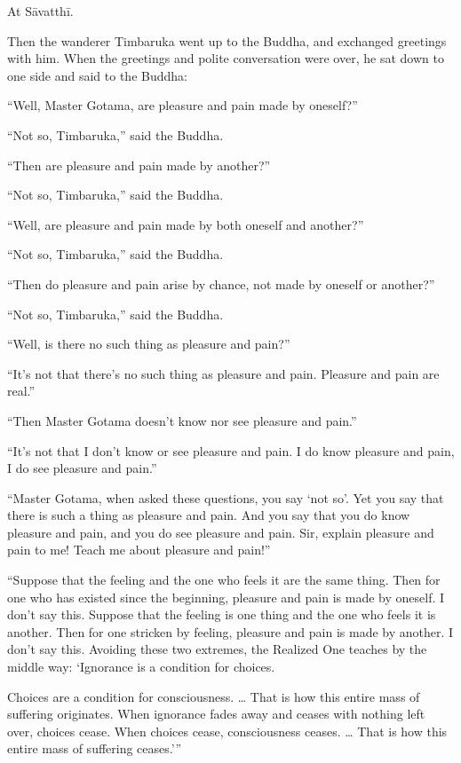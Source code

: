 \documentclass[12pt,openany]{book}%
\begin{document}
At \textsanskrit{Sāvatthī}. 

Then the wanderer Timbaruka went up to the Buddha, and exchanged greetings with him. When the greetings and polite conversation were over, he sat down to one side and said to the Buddha: 

“Well, Master Gotama, are pleasure and pain made by oneself?” 

“Not so, Timbaruka,” said the Buddha. 

“Then are pleasure and pain made by another?” 

“Not so, Timbaruka,” said the Buddha. 

“Well, are pleasure and pain made by both oneself and another?” 

“Not so, Timbaruka,” said the Buddha. 

“Then do pleasure and pain arise by chance, not made by oneself or another?” 

“Not so, Timbaruka,” said the Buddha. 

“Well, is there no such thing as pleasure and pain?” 

“It’s not that there’s no such thing as pleasure and pain. Pleasure and pain are real.” 

“Then Master Gotama doesn’t know nor see pleasure and pain.” 

“It’s not that I don’t know or see pleasure and pain. I do know pleasure and pain, I do see pleasure and pain.” 

“Master Gotama, when asked these questions, you say ‘not so’. Yet you say that there is such a thing as pleasure and pain. And you say that you do know pleasure and pain, and you do see pleasure and pain. Sir, explain pleasure and pain to me! Teach me about pleasure and pain!” 

“Suppose that the feeling and the one who feels it are the same thing. Then for one who has existed since the beginning, pleasure and pain is made by oneself. I don’t say this. Suppose that the feeling is one thing and the one who feels it is another. Then for one stricken by feeling, pleasure and pain is made by another. I don’t say this. Avoiding these two extremes, the Realized One teaches by the middle way: ‘Ignorance is a condition for choices. 

Choices are a condition for consciousness. … That is how this entire mass of suffering originates. When ignorance fades away and ceases with nothing left over, choices cease. When choices cease, consciousness ceases. … That is how this entire mass of suffering ceases.’” 
\end{document}
